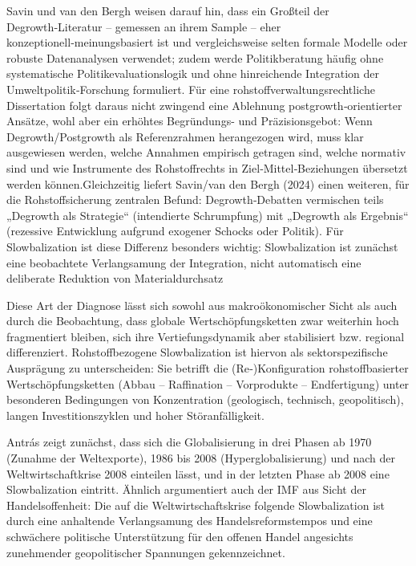 \documentclass[12pt,a4paper,oneside]{book} %
\begin{document}
Savin und van den Bergh weisen darauf hin, dass ein Großteil der Degrowth‑Literatur – gemessen an ihrem Sample – eher konzeptionell‑meinungsbasiert ist und vergleichsweise selten formale Modelle oder robuste Datenanalysen verwendet; zudem werde Politikberatung häufig ohne systematische Politikevaluationslogik und ohne hinreichende Integration der Umweltpolitik‑Forschung formuliert.  Für eine rohstoffverwaltungsrechtliche Dissertation folgt daraus nicht zwingend eine Ablehnung postgrowth‑orientierter Ansätze, wohl aber ein erhöhtes Begründungs- und Präzisionsgebot: Wenn Degrowth/Postgrowth als Referenzrahmen herangezogen wird, muss klar ausgewiesen werden, welche Annahmen empirisch getragen sind, welche normativ sind und wie Instrumente des Rohstoffrechts in Ziel‑Mittel‑Beziehungen übersetzt werden können.Gleichzeitig liefert Savin/van den Bergh (2024) einen weiteren, für die Rohstoffsicherung zentralen Befund: Degrowth‑Debatten vermischen teils „Degrowth als Strategie“ (intendierte Schrumpfung) mit „Degrowth als Ergebnis“ (rezessive Entwicklung aufgrund exogener Schocks oder Politik).  Für Slowbalization ist diese Differenz besonders wichtig: Slowbalization ist zunächst eine beobachtete Verlangsamung der Integration, nicht automatisch eine deliberate Reduktion von Materialdurchsatz

Diese Art der Diagnose lässt sich sowohl aus makroökonomischer Sicht als auch durch die Beobachtung, dass globale Wertschöpfungsketten zwar weiterhin hoch fragmentiert bleiben, sich ihre Vertiefungsdynamik aber stabilisiert bzw. regional differenziert. Rohstoffbezogene Slowbalization ist hiervon als sektorspezifische Ausprägung zu unterscheiden: Sie betrifft die (Re‑)Konfiguration rohstoffbasierter Wertschöpfungsketten (Abbau – Raffination – Vorprodukte – Endfertigung) unter besonderen Bedingungen von Konzentration (geologisch, technisch, geopolitisch), langen Investitionszyklen und hoher Störanfälligkeit.

Antrás zeigt zunächst, dass sich die Globalisierung in drei Phasen ab 1970 (Zunahme der Weltexporte), 1986 bis 2008 (Hyperglobalisierung) und nach der Weltwirtschaftkrise 2008 einteilen lässt, und in der letzten Phase ab 2008 eine Slowbalization eintritt.\autocite{Antrás, P. (2020) De-Globalisation? Global Value Chains in the Post-Covid-19 Age, NBER Working Paper 28115.} Ähnlich argumentiert auch der IMF aus Sicht der Handelsoffenheit: Die auf die Weltwirtschaftskrise folgende Slowbalization ist durch eine anhaltende Verlangsamung des Handelsreformstempos und eine schwächere politische Unterstützung für den offenen Handel angesichts zunehmender geopolitischer Spannungen gekennzeichnet.\autocite{https://www.imf.org/en/blogs/articles/2023/02/08/charting-globalizations-turn-to-slowbalization-after-global-financial-crisis}
\end{document}
